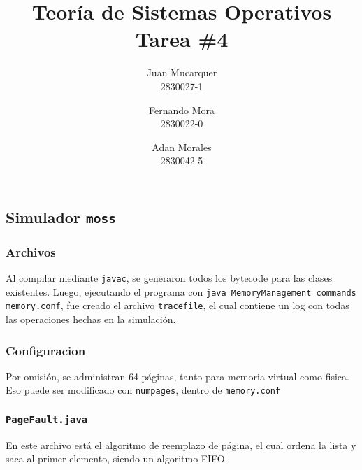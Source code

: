 \documentclass[a4paper,11pt]{article}
\title{Teoría de Sistemas Operativos\\Tarea \#4}
\author{Juan Mucarquer\\2830027-1 \and Fernando Mora\\2830022-0 \and Adan Morales\\2830042-5}
\begin{document}
%	
\maketitle
\renewcommand\thesubsubsection{\thesubsection\alph{subsubsection}}
\setcounter{section}{4}
\subsection{Simulador \texttt{moss}}
\subsubsection{Archivos}
Al compilar mediante \texttt{javac}, se generaron todos los bytecode para las clases
existentes. Luego, ejecutando el programa con \texttt{java MemoryManagement commands memory.conf},
fue creado el archivo \texttt{tracefile}, el cual contiene un log con todas las operaciones hechas
en la simulación.

\subsubsection{Configuracion} Por omisión, se administran 64 páginas, tanto para memoria
virtual como fisica. Eso puede ser modificado con \texttt{numpages}, dentro de \texttt{memory.conf}

\subsubsection{\texttt{PageFault.java}} En este archivo está el algoritmo de reemplazo de página,
el cual ordena la lista y saca al primer elemento, siendo un algoritmo FIFO.
\end{document}
